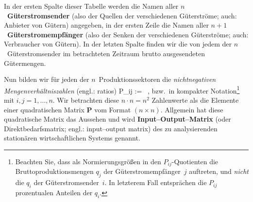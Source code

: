 %
In der ersten Spalte dieser Tabelle werden die Namen aller
$n$~{\bf G\"uterstromsender} (also der Quellen der verschiedenen
G\"uterstr\"ome; auch: Anbieter von G\"utern) angegeben,
in der ersten Zeile die Namen aller
$n+1$~{\bf G\"uterstromempf\"anger} (also der Senken der
verschiedenen G\"uterstr\"ome; auch: Verbraucher von G\"utern).
In der letzten Spalte finden wir die von jedem
der $n$~G\"uterstromsender im betrachteten
Zeitraum brutto ausgesendeten G\"utermengen.

\medskip
\noindent
Nun bilden wir f\"ur jeden der $n$~Produktionssektoren die
{\em nichtnegativen Mengenverh\"altniszahlen\/} (engl.: ratios)
%
\be
P_{ij} :=  \ ,
\ee
%
bzw.\ in kompakter Notation\footnote{Beachten Sie,
dass als Normierungsgr\"o\ss en in den $P_{ij}$-Quotienten die
Bruttoproduktionsmengen $q_{j}$ der G\"uterstromempf\"anger~$j$
auftreten, und {\em nicht\/} die $q_{i}$
der G\"uterstromsender~$i$. In letzterem Fall entspr\"achen die
$P_{ij}$ prozentualen Anteilen der $q_{i}$.}
%
\be
{}
\ee
%
mit $i,j = 1, \ldots, n$. Wir betrachten diese
$n \cdot n = n^{2}$ Zahlenwerte als die Elemente
einer quadratischen Matrix $\mathbf{P}$ vom Format $(n \times n)$.
Allgemein hat diese quadratische Matrix das Aussehen
%
\be
{}
\ee
%
und wird {\bf Input--Output--Matrix} (oder Direktbedarfsmatrix; 
engl.: input--output matrix) des zu analysierenden station\"{a}ren 
wirtschaftlichen Systems genannt.

